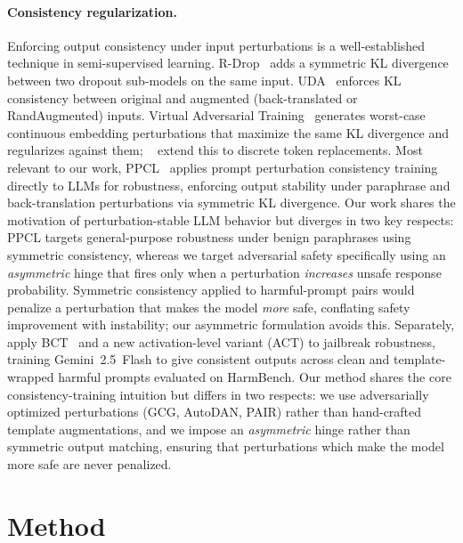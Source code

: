 \documentclass{article}
\begin{document}
\paragraph{Consistency regularization.}
Enforcing output consistency under input perturbations is a well-established technique in semi-supervised learning. R-Drop~\cite{liang2021rdrop} adds a symmetric KL divergence between two dropout sub-models on the same input. UDA~\cite{xie2020uda} enforces KL consistency between original and augmented (back-translated or RandAugmented) inputs. Virtual Adversarial Training~\cite{miyato2018vat} generates worst-case continuous embedding perturbations that maximize the same KL divergence and regularizes against them; ~\citet{park2022vatd} extend this to discrete token replacements.
%
Most relevant to our work, PPCL~\cite{qiang2024ppcl} applies prompt perturbation consistency training directly to LLMs for robustness, enforcing output stability under paraphrase and back-translation perturbations via symmetric KL divergence. Our work shares the motivation of perturbation-stable LLM behavior but diverges in two key respects: PPCL targets general-purpose robustness under benign paraphrases using symmetric consistency, whereas we target adversarial safety specifically using an \emph{asymmetric} hinge that fires only when a perturbation \emph{increases} unsafe response probability. Symmetric consistency applied to harmful-prompt pairs would penalize a perturbation that makes the model \emph{more} safe, conflating safety improvement with instability; our asymmetric formulation avoids this. Separately, \citet{irpan2025consistency} apply BCT~\cite{chua2025bct} and a new activation-level variant (ACT) to jailbreak robustness, training Gemini~2.5~Flash to give consistent outputs across clean and template-wrapped harmful prompts evaluated on HarmBench. Our method shares the core consistency-training intuition but differs in two respects: we use adversarially optimized perturbations (GCG, AutoDAN, PAIR) rather than hand-crafted template augmentations, and we impose an \emph{asymmetric} hinge rather than symmetric output matching, ensuring that perturbations which make the model more safe are never penalized.
\section{Method}
\label{sec:method}
\end{document}
